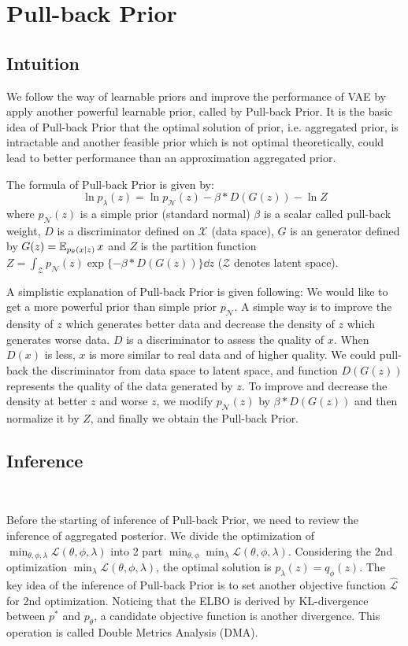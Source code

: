 \section{Pull-back Prior}\label{sec:pull_back_prior}

\subsection{Intuition}
We follow the way of learnable priors and improve the performance of VAE by apply another powerful learnable prior, called by Pull-back Prior. It is the basic idea of Pull-back Prior that the optimal solution of prior, i.e. aggregated prior, is intractable and another feasible prior which is not optimal theoretically, could lead to better performance than an approximation aggregated prior.

The formula of Pull-back Prior is given by:
\begin{equation}\label{eq:pull_back_prior}
	\ln p_\lambda(z) = \ln p_\mathcal{N}(z) - \beta * D(G(z)) - \ln Z \tag{4}
\end{equation}
where $p_\mathcal{N}(z)$ is a simple prior (\EG standard normal) $\beta$ is a scalar called pull-back weight, $D$ is a discriminator defined on $\mathcal{X}$ (data space), $G$ is an generator defined by $G(z) = \operatorname{\mathbb{E}}_{p_\theta(x|z)} x$ and $Z$ is the partition function $Z = \int_{\mathcal{Z}} p_\mathcal{N}(z) \exp\{- \beta * D(G(z))\} \dd z$ ($\mathcal{Z}$ denotes latent space).

A simplistic explanation of Pull-back Prior is given following: We would like to get a more powerful prior than simple prior $p_\mathcal{N}$. A simple way is to improve the density of $z$ which generates better data and decrease the density of $z$ which generates worse data. $D$ is a discriminator to assess the quality of $x$. When $D(x)$ is less, $x$ is more similar to real data and of higher quality. We could pull-back the discriminator from data space to latent space, and function $D(G(z))$ represents the quality of the data generated by $z$. To improve and decrease the density at better $z$ and worse $z$, we modify $p_\mathcal{N}(z)$ by $\beta * D(G(z))$ and then normalize it by $Z$, and finally we obtain the Pull-back Prior. 

\subsection{Inference}~\label{subsec:inference}

Before the starting of inference of Pull-back Prior, we need to review the inference of aggregated posterior. We divide the optimization of $\min_{\theta, \phi, \lambda} \mathcal{L}(\theta, \phi, \lambda)$ into 2 part $\min_{\theta, \phi} \min_{\lambda} \mathcal{L}(\theta, \phi, \lambda)$. Considering the 2nd optimization $\min_\lambda \mathcal{L}(\theta, \phi, \lambda)$, the optimal solution is $p_\lambda(z) = q_\phi(z)$. The key idea of the inference of Pull-back Prior is to set another objective function $\hat{\mathcal{L}}$ for 2nd optimization. Noticing that the ELBO is derived by KL-divergence between $p^*$ and $p_\theta$, a candidate objective function is another divergence. This operation is called Double Metrics Analysis (DMA). 

